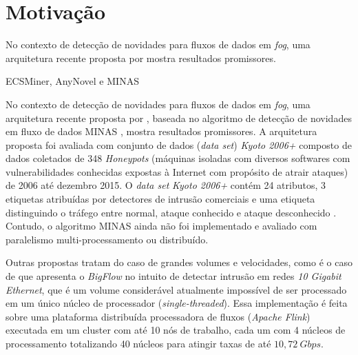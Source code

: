 \section{Motivação}\label{sec:motivo}

No contexto de detecção de novidades para fluxos de dados em \emph{fog}, uma
arquitetura recente proposta por  mostra resultados promissores.

ECSMiner, AnyNovel e MINAS

No contexto de detecção de novidades para fluxos de dados em \emph{fog}, uma
arquitetura recente proposta por , baseada no algoritmo
de detecção de novidades em fluxo de dados MINAS
\cite{Faria2016minas}, mostra resultados promissores.
A arquitetura proposta foi avaliada com conjunto de dados (\emph{data set}) \emph{Kyoto 2006+} 
composto de dados coletados de 348 \emph{Honeypots} (máquinas isoladas com diversos softwares
com vulnerabilidades conhecidas expostas à Internet com propósito de atrair
ataques) de 2006 até dezembro 2015.
O \emph{data set} \emph{Kyoto 2006+} contém 24 atributos, 3 etiquetas atribuídas por
detectores de intrusão comerciais e uma etiqueta
distinguindo o tráfego entre normal, ataque conhecido e ataque desconhecido
\cite{Cassales2019a}.
Contudo, o algoritmo MINAS ainda não foi implementado e avaliado com paralelismo
multi-processamento ou distribuído.

Outras propostas tratam do caso de grandes volumes e velocidades, como é o caso
de  que apresenta o \emph{BigFlow} no intuito de detectar
intrusão em redes \emph{10 Gigabit Ethernet}, que é um volume considerável
atualmente impossível de ser processado em um único núcleo de processador
(\emph{single-threaded}). Essa implementação é feita sobre uma plataforma
distribuída processadora de fluxos (\emph{Apache Flink}) executada em um cluster
com até 10 nós de trabalho, cada um com 4 núcleos de processamento totalizando
40 núcleos para atingir taxas de até $10,72 \ Gbps$.


